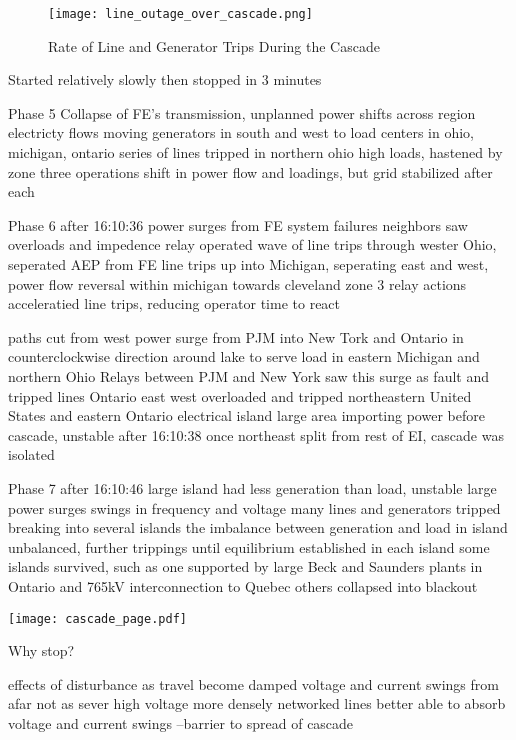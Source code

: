 \begin{figure}
\begin{center}
\texttt{[image: line\_outage\_over\_cascade.png]}
\end{center}
\caption{Rate of Line and Generator Trips During the Cascade}
\end{figure}


Started relatively slowly
then stopped in 3 minutes

Phase 5
Collapse of FE's transmission, unplanned power shifts across region
electricty flows moving generators in south and west to load centers in ohio, michigan, ontario
series of lines tripped in northern ohio high loads, hastened by zone three operations
shift in power flow and loadings, but grid stabilized after each

Phase 6
after 16:10:36
power surges from FE system failures neighbors saw overloads and impedence relay operated
wave of line trips through wester Ohio, seperated AEP from FE
line trips up into Michigan, seperating east and west, power flow reversal within michigan towards cleveland
zone 3 relay actions acceleratied line trips, reducing operator time to react

paths cut from west
power surge from PJM into New Tork and Ontario
in counterclockwise direction around lake
to serve load in eastern Michigan and northern Ohio
Relays between PJM and New York saw this surge as fault and tripped lines
Ontario east west overloaded and tripped
northeastern United States and eastern Ontario electrical island
large area importing power before cascade, unstable after 16:10:38
once northeast split from rest of EI, cascade was isolated

Phase 7 
after 16:10:46
large island had less generation than load, unstable
large power surges swings in frequency and voltage
many lines and generators tripped
breaking into several islands
the imbalance between generation and load in island unbalanced, further trippings until
equilibrium established in each island
some islands survived, such as one supported by
large Beck and Saunders plants in Ontario and
765kV interconnection to Quebec
others collapsed into blackout



\begin{center}
\texttt{[image: cascade\_page.pdf]}
\end{center}


Why stop?

effects of disturbance as travel become damped
voltage and current swings from afar not as sever
high voltage more densely networked lines better able to absorb voltage and current swings
--barrier to spread of cascade

